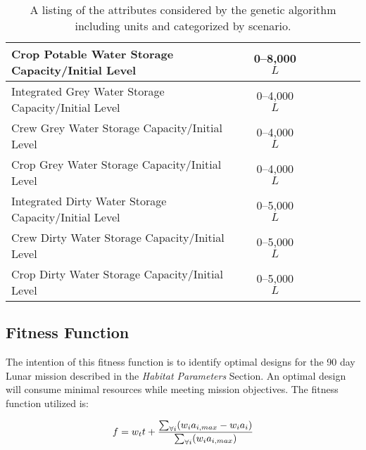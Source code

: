 \documentclass[submit]{aiaa}
\begin{document}
\begin{table}[htb]
\begin{tabular}{l c c c c c c}
	Crop Potable Water Storage Capacity/Initial Level & 0--8,000 $L$ & & & \checkmark & & \checkmark \\ \hline
	Integrated Grey Water Storage Capacity/Initial Level & 0--4,000 $L$ & \checkmark & \checkmark & & \checkmark \\
	Crew Grey Water Storage Capacity/Initial Level & 0--4,000 $L$ & & & \checkmark & & \checkmark \\
	Crop Grey Water Storage Capacity/Initial Level & 0--4,000 $L$ & & & \checkmark & & \checkmark \\ \hline
	Integrated Dirty Water Storage Capacity/Initial Level & 0--5,000 $L$ & \checkmark & \checkmark & & \checkmark \\
	Crew Dirty Water Storage Capacity/Initial Level & 0--5,000 $L$ & & & \checkmark & & \checkmark \\
	Crop Dirty Water Storage Capacity/Initial Level & 0--5,000 $L$ & & & \checkmark & & \checkmark \\ \hline
	\end{tabular}
	\caption{A listing of the attributes considered by the genetic algorithm including units and categorized by scenario.}
	\label{tab:attributes}
\end{table}

\subsection{Fitness Function}
\label{sec:fitness}

The intention of this fitness function is to identify optimal
designs for the 90 day Lunar mission described in the \emph{Habitat Parameters} Section.
An optimal design will consume minimal
resources while meeting mission objectives. The fitness function
utilized is:

\[ f = w_tt + {{{\sum_{\forall i} (w_ia_{i,max} - w_ia_i)} \over {\sum_{\forall i}
(w_ia_{i,max})}}}  \]
\end{document}
